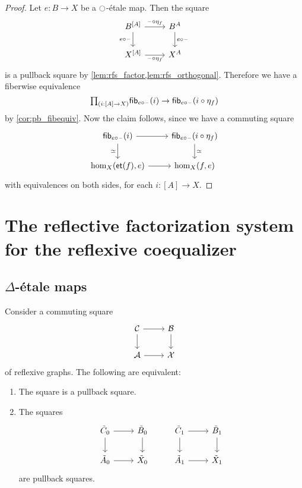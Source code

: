 \begin{proof}
Let $e:B\to X$ be a ${\ocircle}$-\'etale map. Then the square
\begin{equation*}
\begin{tikzcd}
B^{[A]} \arrow[r,"\blank\circ\eta_f"] \arrow[d,swap,"e\circ\blank"] & B^A \arrow[d,"e\circ\blank"] \\
X^{[A]} \arrow[r,swap,"\blank\circ\eta_f"] & X^A
\end{tikzcd}
\end{equation*}
is a pullback square by \cref{lem:rfs_factor,lem:rfs_orthogonal}. Therefore we have a fiberwise equivalence
\begin{equation*}
\prd{i:[A]\to X} \fib{e\circ\blank}{i}\to \fib{e\circ\blank}{i\circ\eta_f}
\end{equation*}
by \cref{cor:pb_fibequiv}. Now the claim follows, since we have a commuting square
\begin{equation*}
\begin{tikzcd}
\fib{e\circ\blank}{i} \arrow[r] \arrow[d,swap,"\eqvsym"] & \fib{e\circ\blank}{i\circ\eta_f} \arrow[d,"\eqvsym"] \\
\mathrm{hom}_X(\mathsf{et}(f),e) \arrow[r] & \mathrm{hom}_X(f,e)
\end{tikzcd}
\end{equation*}
with equivalences on both sides, for each $i:[A]\to X$.
\end{proof}
 
\section{The reflective factorization system for the reflexive coequalizer}

\subsection{\texorpdfstring{$\Delta$}{Δ}-\'etale maps}

\begin{prp}
Consider a commuting square
\begin{equation*}
\begin{tikzcd}
\mathcal{C} \arrow[r] \arrow[d] & \mathcal{B} \arrow[d] \\
\mathcal{A} \arrow[r] & \mathcal{X}
\end{tikzcd}
\end{equation*}
of reflexive graphs. The following are equivalent:
\begin{enumerate}
\item The square is a pullback square.
\item The squares
\begin{equation*}
\begin{tikzcd}
\tilde{C}_0 \arrow[r] \arrow[d] & \tilde{B}_0 \arrow[d] & \tilde{C}_1 \arrow[r] \arrow[d] & \tilde{B}_1 \arrow[d] \\
\tilde{A}_0 \arrow[r] & \tilde{X}_0 & \tilde{A}_1 \arrow[r] & \tilde{X}_1
\end{tikzcd}
\end{equation*}
are pullback squares.
\end{enumerate}
\end{prp}

